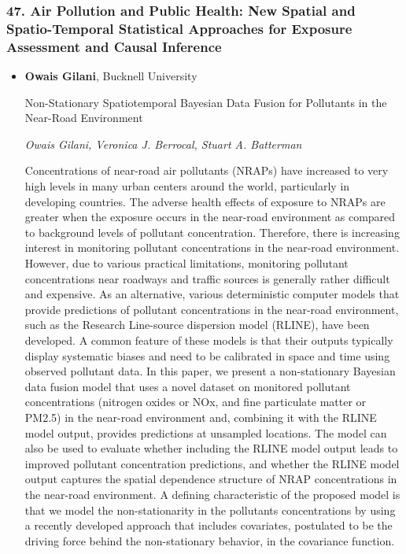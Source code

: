 \subsubsection*{47. Air Pollution and Public Health: New Spatial and Spatio-Temporal Statistical Approaches for Exposure Assessment and Causal Inference}

\begin{itemize}
\item \textbf{Owais Gilani}, Bucknell University

Non-Stationary Spatiotemporal Bayesian Data Fusion for Pollutants in the Near-Road Environment

\emph{\footnotesize Owais Gilani, Veronica J. Berrocal, Stuart A. Batterman}

Concentrations of near-road air pollutants (NRAPs) have increased to very high levels in many urban centers around the world, particularly in developing countries. The adverse health effects of exposure to NRAPs are greater when the exposure occurs in the near-road environment as compared to background levels of pollutant concentration. Therefore, there is increasing interest in monitoring pollutant concentrations in the near-road environment. However, due to various practical limitations, monitoring pollutant concentrations near roadways and traffic sources is generally rather difficult and expensive. As an alternative, various deterministic computer models that provide predictions of pollutant concentrations in the near-road environment, such as the Research Line-source dispersion model (RLINE), have been developed. A common feature of these models is that their outputs typically display systematic biases and need to be calibrated in space and time using observed pollutant data. In this paper, we present a non-stationary Bayesian data fusion model that uses a novel dataset on monitored pollutant concentrations (nitrogen oxides  or NOx, and fine particulate matter or PM2.5) in the near-road environment and, combining it with the RLINE model output, provides predictions at unsampled locations. The model can also be used to evaluate whether including the RLINE model output leads to improved pollutant concentration predictions, and whether the RLINE model output captures the spatial dependence structure of NRAP concentrations in the near-road environment. A defining characteristic of the proposed model is that we model the non-stationarity in the pollutants concentrations by using a recently developed approach that includes covariates, postulated to be the driving force behind the non-stationary behavior, in the covariance function.


\end{itemize}
